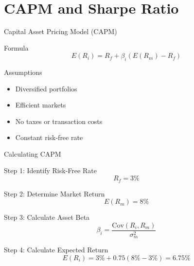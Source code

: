 \documentclass{beamer}
\begin{document}
\section{CAPM and Sharpe Ratio}
\begin{frame}{Capital Asset Pricing Model (CAPM)}
    \begin{block}{Formula} 
        \begin{equation*}
            E(R_i) = R_f + \beta_i (E(R_m) - R_f)
        \end{equation*}
    \end{block}
    \begin{block}{Assumptions}
        \begin{itemize}
            \item Diversified portfolios
            \item Efficient markets
            \item No taxes or transaction costs
            \item Constant risk-free rate
        \end{itemize}
    \end{block}
\end{frame}


\begin{frame}{Calculating CAPM}
    \begin{block}{Step 1: Identify Risk-Free Rate}
        \begin{equation*}
            R_f = 3\%
        \end{equation*}
    \end{block}
    \begin{block}{Step 2: Determine Market Return}
        \begin{equation*}
            E(R_m) = 8\%
        \end{equation*}
    \end{block}
    \begin{block}{Step 3: Calculate Asset Beta}
        \begin{equation*}
            \beta_i = \frac{\text{Cov}(R_i, R_m)}{\sigma_m^2}
        \end{equation*}
    \end{block}
    \begin{block}{Step 4: Calculate Expected Return}
        \begin{equation*}
            E(R_i) = 3\% + 0.75 (8\% - 3\%) = 6.75\%
        \end{equation*}
    \end{block}
\end{frame}
\end{document}
